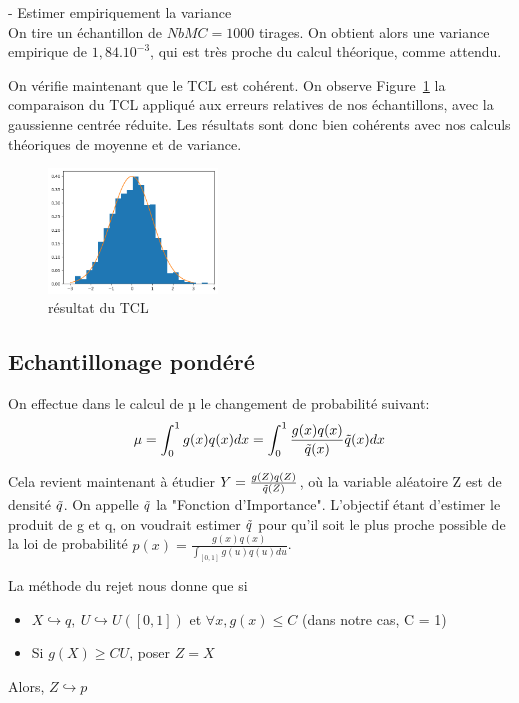 \documentclass{article}
\begin{document}
- Estimer empiriquement la variance\\
On tire un échantillon de $NbMC=1000$ tirages. On obtient alors une variance empirique de $1,84.10^{-3}$, qui est très proche du calcul théorique, comme attendu.

On vérifie maintenant que le TCL est cohérent. On observe Figure~\ref{TP1_MC_TCL} la comparaison du TCL appliqué aux erreurs relatives de nos échantillons, avec la gaussienne centrée réduite. Les résultats sont donc bien cohérents avec nos calculs théoriques de moyenne et de variance.

\begin{figure}[ht]
\centering
\includegraphics[width=0.4\textwidth]{TP1/MC_brute_TCL.png}
\caption{résultat du TCL}
\label{TP1_MC_TCL}
\end{figure}



\subsection{Echantillonage pondéré}
On effectue dans le calcul de µ le changement de probabilité suivant:
$$ \mu = \int_0^1 g(x)q(x)dx = \int_0^1 \frac{g(x)q(x)}{\Tilde{q}(x)} \Tilde{q}(x) dx $$

Cela revient maintenant à étudier $Y=\frac{g(Z)q(Z)}{\Tilde{q}(Z)}$, où la variable aléatoire Z est de densité $\Tilde{q}$. On appelle $\Tilde{q}$ la "Fonction d'Importance". L'objectif étant d'estimer le produit de g et q, on voudrait estimer $\Tilde{q}$ pour qu'il soit le plus proche possible de la loi de probabilité $p(x) = \frac{g(x)q(x)}{\int_{[0,1]} g(u)q(u)du}$.

La méthode du rejet nous donne que si
\begin{itemize}
 \item $X \hookrightarrow q,\ U \hookrightarrow U([0,1])$ et $\forall x, g(x) \leq C$ (dans notre cas, C = 1)
 \item Si $g(X) \geq CU$, poser $Z=X$
\end{itemize}

Alors, $Z \hookrightarrow p $\\
\end{document}
